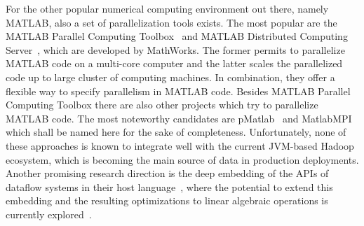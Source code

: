 For the other popular numerical computing environment out there, namely MATLAB, also a set of parallelization tools exists. 
The most popular are the MATLAB Parallel Computing Toolbox~\cite{parallelComputingToolbox} and MATLAB Distributed Computing Server~\cite{distributedComputingServer}, which are developed by MathWorks. 
The former permits to parallelize MATLAB code on a multi-core computer and the latter scales the parallelized code up to large cluster of computing machines. 
In combination, they offer a flexible way to specify parallelism in MATLAB code. 
Besides MATLAB Parallel Computing Toolbox there are also other projects which try to parallelize MATLAB code. 
The most noteworthy candidates are pMatlab~\cite{bliss:ijhpca2007a} and MatlabMPI~\cite{kepner:jpdc2004a} which shall be named here for the sake of completeness. 
Unfortunately, none of these approaches is known to integrate well with the current JVM-based Hadoop ecosystem, which is becoming the main source of data in production deployments. 
Another promising research direction is the deep embedding of the APIs of dataflow systems in their host language~\cite{Alexandrov2015}, where the potential to extend this embedding and the resulting optimizations to linear algebraic operations is currently explored~\cite{Kunft2016}.